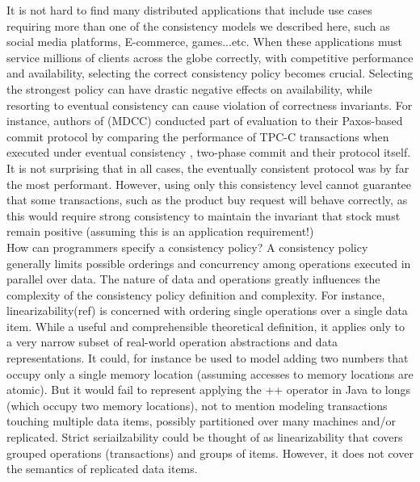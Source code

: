 It is not hard to find many distributed applications that include use cases
requiring more than one of the consistency models we described here, such as social media
platforms, E-commerce, games...etc. When these applications must service millions of
clients across the globe correctly, with competitive performance and
availability, selecting the correct consistency policy becomes crucial.
Selecting the strongest policy can have drastic negative effects on availability, while
resorting to eventual consistency can cause violation of correctness invariants.
For instance, authors of (MDCC) conducted part of evaluation to their Paxos-based commit
protocol by comparing the performance of TPC-C transactions when executed under eventual consistency  
, two-phase commit  and their protocol itself. It is not surprising that in all cases, the eventually
consistent protocol was by far the most
performant. However, using only this consistency level cannot guarantee that
some transactions, such as the product buy request will behave correctly, as
this would require strong consistency to maintain the invariant that stock must
remain positive (assuming this is an application requirement!) \\

How can programmers specify a consistency policy? 
A consistency policy generally limits possible orderings and concurrency among
operations executed in parallel over data. The nature of data and operations
greatly influences the complexity of the consistency policy definition and
complexity. For instance, linearizability(ref) is concerned with ordering single
operations over a single data item. While a useful and comprehensible theoretical
definition, it applies only to a very narrow subset of real-world operation
abstractions and data representations. It could, for instance be used to model adding
two numbers that occupy only a single memory location (assuming accesses to
memory locations are atomic). But it would fail to represent applying the ++
operator in Java to longs (which occupy two memory locations), not to mention
modeling transactions touching multiple data items, possibly partitioned over many
machines and/or replicated. Strict seriailzability could be thought of as
linearizability that covers grouped operations (transactions) and groups of
items. However, it does not cover the semantics of replicated data items.\\

